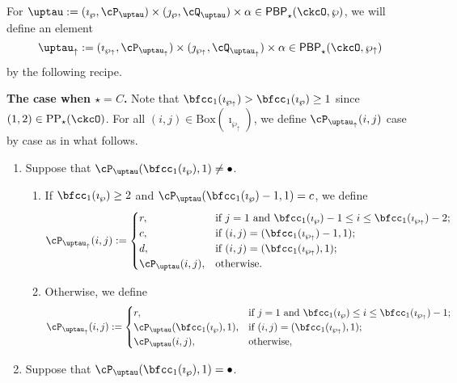 \documentclass[12pt]{amsart}
\numberwithin{equation}{section}
\theoremstyle{remark}
\def\BOX#1{\mathrm{Box}(#1)}
\def\CPP{\mathrm{PP}}
\def\PBP{\mathsf{PBP}}
\def\PBPop#1#2#3#4{\PBP_{#1}^{#2}(#3,#4)}
\newcommand{\PBPOP}[1][]{\PBPop{\star}{#1}{\ckcO}{\wp}}
\def\wpu{\wp_{\uparrow}}
\def\wpd{\wp} %
\def\uptauu{\uptau_{\uparrow}}
\def\uptaud{\uptau} %
\begin{document}
 For
 $\uptau := (\imath_{\wp},\cP_{\uptau})\times (\jmath_{\wp},\cQ_{\uptau})\times \alpha \in \PBPOP $,
 we will define an element
 \[
   \uptauu:= (\imath_{\wpu}, \cP_{\uptauu})\times (\jmath_{\wpu},\cQ_{\uptauu})\times \alpha\in \PBPop{\star}{}{\ckcO}{\wpu}
 \]
 by the following recipe.



 \newcommand{\localtextbulletone}{\textcolor{black}{\raisebox{.45ex}{\rule{.6ex}{.6ex}}}}

\medskip
 {\bfseries The case when $\star = C$.}
 Note that $\bfcc_1(\imath_{\wpu})> \bfcc_1(\imath_\wp)\geq 1$ since $(1,2)\in \CPP_\star(\ckcO)$.
  For all $(i,j)\in \BOX{\imath_{\wpu}}$, we define $\cP_{\uptauu}(i,j)$ case by
  case as in what follows.
 \begin{enumerate}[label=(\alph*)]
   \item Suppose that
   $\cP_{\uptaud}(\bfcc_{1}(\imath_{\wpd}),1)\neq \bullet$.
   \begin{enumerate}[label={\localtextbulletone}]
     \item If $\bfcc_{1}(\imath_{\wpd})\geq 2$ and
     $\cP_{\uptau}(\bfcc_{1}(\imath_{\wpd})-1,1) = c$,
     we define
     \[
       \cP_{\uptauu}(i,j) := \begin{cases}
         r ,& \text{if $j=1$ and $\bfcc_{1}(\imath_{\wpd})-1
           \leq i \leq \bfcc_{1}(\imath_{\wpu})-2$};\\
         c ,& \text{if $(i,j)=(\bfcc_{1}(\imath_{\wpu})-1,1)$};\\
         d ,& \text{if $(i,j)=(\bfcc_{1}(\imath_{\wpu}),1)$};\\
         \cP_{\uptaud}(i,j) ,&\text{otherwise}.
       \end{cases}
     \]
     \item Otherwise, we define
     \[
       \cP_{\uptauu}(i,j) := \begin{cases}
         r ,& \text{if $j=1$ and $\bfcc_{1}(\imath_{\wp})
           \leq i \leq \bfcc_{1}(\imath_{\wpu})-1$};\\
         \cP_{\uptaud}(\bfcc_{1}(\imath_{\wpd}),1), &
         \text{if $(i,j)=(\bfcc_{1}(\imath_{\wpu}),1)$};\\
         \cP_{\uptaud}(i,j) ,&\text{otherwise},
       \end{cases}
     \]
   \end{enumerate}
   \item Suppose that $\cP_{\uptaud}(\bfcc_{1}(\imath_{\wpd}),1)=\bullet$.
   \begin{enumerate}[label={\localtextbulletone}]

\end{enumerate}
\end{enumerate}
\end{document}
